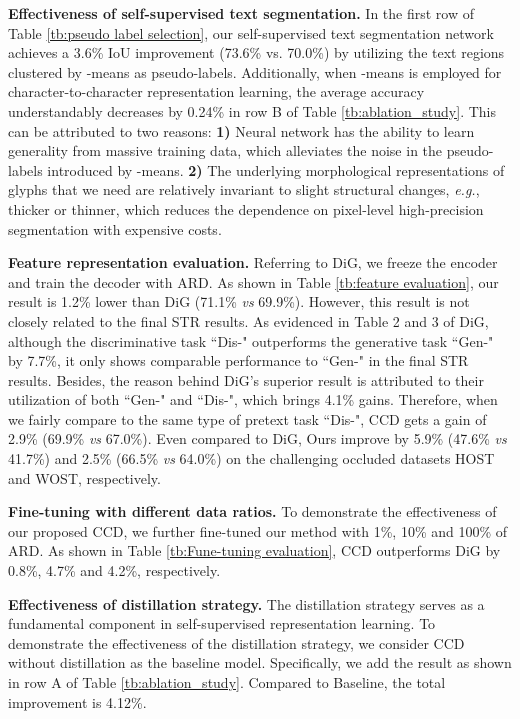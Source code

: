 \documentclass[10pt,twocolumn,letterpaper]{article}
\begin{document}
\noindent \textbf{Effectiveness of self-supervised text segmentation.}
In the first row of Table \ref{tb:pseudo label selection}, our self-supervised text segmentation network achieves a 3.6\% IoU improvement (73.6\% vs. 70.0\%) by utilizing the text regions clustered by -means as pseudo-labels. Additionally, when -means is employed for character-to-character representation learning, the average accuracy understandably decreases by 0.24\% in row B of Table \ref{tb:ablation_study}.
This can be attributed to two reasons:
\textbf{1)} Neural network has the ability to learn generality from massive training data, which alleviates the noise in the pseudo-labels introduced by -means. \textbf{2)} The underlying morphological representations of glyphs that we need are relatively invariant to slight structural changes, \emph{e.g.}, thicker or thinner, which reduces the dependence on pixel-level high-precision segmentation with expensive costs. 

\noindent \textbf{Feature representation evaluation.}
Referring to DiG, we freeze the encoder and train the decoder with ARD. As shown in Table \ref{tb:feature evaluation}, our result is 1.2\% lower than DiG (71.1\% \emph{vs} 69.9\%). However, this result is not closely related to the final STR results. As evidenced in Table 2 and 3 of DiG, although the discriminative task ``Dis-" outperforms the generative task ``Gen-" by 7.7\%, it only shows comparable performance to ``Gen-" in the final STR results. Besides, the reason behind DiG's superior result is attributed to their utilization of both ``Gen-" and ``Dis-", which brings 4.1\% gains. Therefore, when we fairly compare to the same type of pretext task ``Dis-",  CCD gets a gain of 2.9\% (69.9\% \emph{vs} 67.0\%). Even compared to DiG, Ours improve by 5.9\% (47.6\% \emph{vs} 41.7\%) and 2.5\% (66.5\% \emph{vs} 64.0\%) on the challenging occluded datasets HOST and WOST, respectively.

\noindent \textbf{Fine-tuning with different data ratios.}
To demonstrate the effectiveness of our proposed CCD, we further fine-tuned our method with 1\%, 10\% and 100\% of ARD. As shown in Table \ref{tb:Fune-tuning evaluation}, CCD outperforms DiG by 0.8\%, 4.7\% and 4.2\%, respectively.

\noindent \textbf{Effectiveness of distillation strategy.} 
The distillation strategy serves as a fundamental component in self-supervised representation learning.
To demonstrate the effectiveness of the distillation strategy, we consider CCD without distillation as the baseline model. Specifically, we add the result as shown in row A of Table \ref{tb:ablation_study}. Compared to Baseline, the total improvement is 4.12\%.
\end{document}
